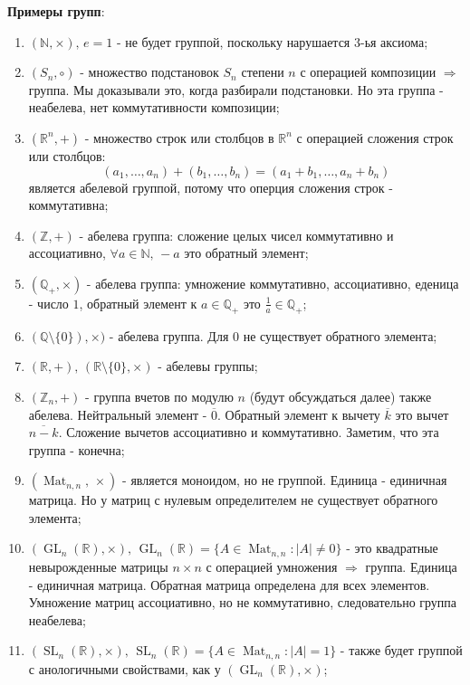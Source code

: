\documentclass[12pt]{article}
\newcommand{\MR}{\mathbb{R}}
\newcommand{\MQ}{\mathbb{Q}}
\newcommand{\MN}{\mathbb{N}}
\newcommand{\MZ}{\mathbb{Z}}
\theoremstyle{definition}
\newcommand{\mat}[2]{\operatorname{Mat}_{#1, #2}}
\DeclareMathOperator{\GL}{\operatorname{GL}}
\DeclareMathOperator{\SL}{\operatorname{SL}}
\begin{document}
\newpage
\textbf{Примеры групп}:
\begin{enumerate}[label=\arabic*)]
	\item $(\MN, \times), \, e = 1$ - не будет группой, поскольку нарушается $3$-ья аксиома;
	\item $(S_n, \circ)$ - множество подстановок $S_n$ степени $n$ с операцией композиции $\Rightarrow$ группа. Мы доказывали это, когда разбирали подстановки. Но эта группа - неабелева, нет коммутативности композиции;
	\item $(\MR^n, +)$ - множество строк или столбцов в $\MR^n$ с операцией сложения строк или столбцов: 
	$$
		(a_1 , \dotsc, a_n) + (b_1, \dotsc, b_n) = (a_1 + b_1,\dotsc, a_n + b_n)
	$$
	является абелевой группой, потому что оперция сложения строк - коммутативна;
	\item $(\MZ,+)$ - абелева группа: сложение целых чисел коммутативно и ассоциативно, $\forall a \in \MN, \, -a$ это обратный элемент;
	
	\item $(\MQ_+, \times)$ - абелева группа: умножение коммутативно, ассоциативно, еденица - число $1$, обратный элемент к $a \in \MQ_{+}$ это $\tfrac{1}{a} \in \MQ_{+}$;
	
	\item $(\MQ \setminus \{0\}), \times)$ - абелева группа. Для $0$ не существует обратного элемента;
	
	\item $(\MR, +), \, (\MR\setminus\{0\}, \times)$ - абелевы группы;
	
	\item $(\MZ_n,+)$ - группа вчетов по модулю $n$ (будут обсуждаться далее) также абелева. Нейтральный элемент - $\overline{0}$. Обратный элемент к вычету $\overline{k}$ это вычет $\overline{n-k}$. Сложение вычетов ассоциативно и коммутативно. Заметим, что эта группа - конечна;
	
	\item $(\mat{n}{n}, \, \times)$ - является моноидом, но не группой. Единица - единичная матрица. Но у матриц с нулевым определителем не существует обратного элемента;
	
	\item $(\GL_n(\MR),\times), \, \GL_n(\MR) = \{A \in \mat{n}{n} \colon |A| \neq 0\}$ -  это квадратные невырожденные матрицы $n \times n$ с операцией умножения $\Rightarrow$ группа. Единица - единичная матрица. Обратная матрица определена для всех элементов. Умножение матриц ассоциативно, но не коммутативно, следовательно группа неабелева;
	
	\item $(\SL_n(\MR), \times), \, \SL_n(\MR) = \{A \in \mat{n}{n} \colon |A| = 1\}$ - также будет группой с анологичными свойствами, как у $(\GL_n(\MR),\times)$;
\end{enumerate}
\end{document}
